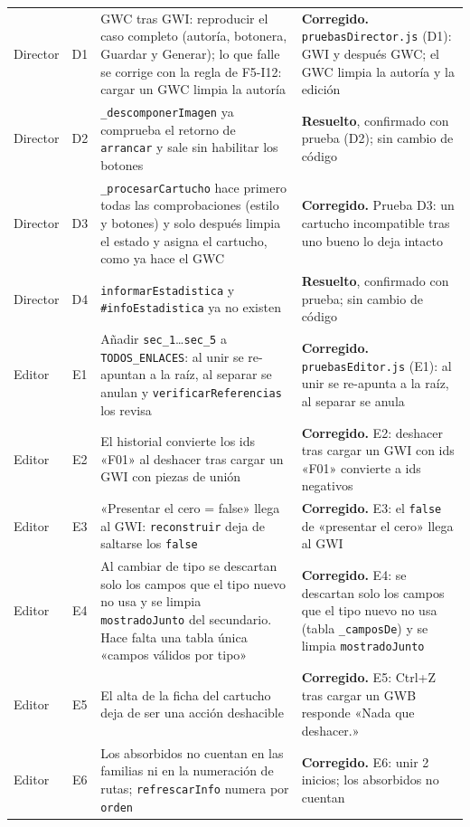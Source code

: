 \begin{xltabular}{\textwidth}{l c >{\RaggedRight\arraybackslash}X >{\RaggedRight\arraybackslash}X}
	Director & D1 & GWC tras GWI: reproducir el caso completo (autoría, botonera, Guardar y Generar); lo que falle se corrige con la regla de F5-I12: cargar un GWC limpia la autoría & \textbf{Corregido.} \texttt{pruebasDirector.js} (D1): GWI y después GWC; el GWC limpia la autoría y la edición \\
	Director & D2 & \texttt{\_descomponerImagen} ya comprueba el retorno de \texttt{arrancar} y sale sin habilitar los botones & \textbf{Resuelto}, confirmado con prueba (D2); sin cambio de código \\
	Director & D3 & \texttt{\_procesarCartucho} hace primero todas las comprobaciones (estilo y botones) y solo después limpia el estado y asigna el cartucho, como ya hace el GWC & \textbf{Corregido.} Prueba D3: un cartucho incompatible tras uno bueno lo deja intacto \\
	Director & D4 & \texttt{informarEstadistica} y \texttt{\#infoEstadistica} ya no existen & \textbf{Resuelto}, confirmado con prueba; sin cambio de código \\
	Editor & E1 & Añadir \texttt{sec\_1}…\texttt{sec\_5} a \texttt{TODOS\_ENLACES}: al unir se re-apuntan a la raíz, al separar se anulan y \texttt{verificarReferencias} los revisa & \textbf{Corregido.} \texttt{pruebasEditor.js} (E1): al unir se re-apunta a la raíz, al separar se anula \\
	Editor & E2 & El historial convierte los ids «F01» al deshacer tras cargar un GWI con piezas de unión & \textbf{Corregido.} E2: deshacer tras cargar un GWI con ids «F01» convierte a ids negativos \\
	Editor & E3 & «Presentar el cero = false» llega al GWI: \texttt{reconstruir} deja de saltarse los \texttt{false} & \textbf{Corregido.} E3: el \texttt{false} de «presentar el cero» llega al GWI \\
	Editor & E4 & Al cambiar de tipo se descartan solo los campos que el tipo nuevo no usa y se limpia \texttt{mostradoJunto} del secundario. Hace falta una tabla única «campos válidos por tipo» & \textbf{Corregido.} E4: se descartan solo los campos que el tipo nuevo no usa (tabla \texttt{\_camposDe}) y se limpia \texttt{mostradoJunto} \\
	Editor & E5 & El alta de la ficha del cartucho deja de ser una acción deshacible & \textbf{Corregido.} E5: Ctrl+Z tras cargar un GWB responde «Nada que deshacer.» \\
	Editor & E6 & Los absorbidos no cuentan en las familias ni en la numeración de rutas; \texttt{refrescarInfo} numera por \texttt{orden} & \textbf{Corregido.} E6: unir 2 inicios; los absorbidos no cuentan \\

\end{xltabular}
